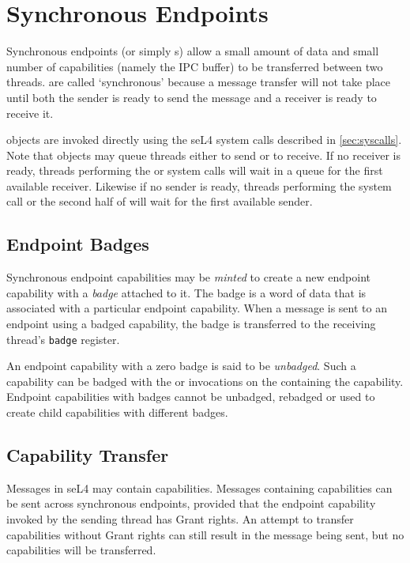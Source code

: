 \section{Synchronous Endpoints}

Synchronous endpoints (or simply s) allow a small amount
of data and small number of capabilities (namely the IPC buffer) to be transferred between two
threads.  are called
`synchronous' because a message transfer will not take
place until both the sender is ready to send the message and a receiver is
ready to receive it.

 objects are invoked directly using the seL4 system calls
described in \autoref{sec:syscalls}. Note that  objects may queue
threads either to send or to receive. If no receiver is ready, threads
performing the  or 
system calls will wait in a queue for the first available receiver. Likewise if
no sender is ready, threads performing the 
system call or the second half of 
will wait for the first available sender.

\subsection{Endpoint Badges}
\label{sec:ep-badges}

Synchronous endpoint capabilities may be \emph{minted} to
create a new endpoint capability with a \emph{badge} attached to it. The
badge is a word of data that is associated with a particular endpoint
capability. When a message is sent to an endpoint using a badged
capability, the badge is transferred to the receiving thread's
\texttt{badge} register.

An endpoint capability with a zero badge is said to be \emph{unbadged}.
Such a capability can be badged with the  or 
invocations on the  containing the capability. Endpoint
capabilities with badges cannot be unbadged, rebadged or used to create
child capabilities with different badges.

\subsection{Capability Transfer}
\label{sec:cap-transfer}

Messages in seL4 may contain capabilities. Messages containing capabilities can
be sent across synchronous endpoints, provided that the endpoint capability
invoked by the sending thread has Grant rights. An attempt to transfer
capabilities without Grant rights can still result in the message being sent,
but no capabilities will be transferred.

